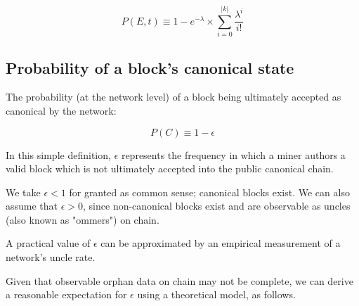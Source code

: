 \documentclass[11pt]{article}
\theoremstyle{plain}
\newcommand{\comment}[1]{}
\begin{document}
{\begin{equation}
P(E,t) \equiv 1 - e^{-\lambda} \times \sum_{i=0}^{|k|}{\frac{\lambda^{i}}{i!}} 
\end{equation}



\subsection{\normalsize{Probability of a block's canonical state}}

The probability (at the network level) of a block being ultimately accepted as
canonical by the network:

\begin{equation}
P(C) \equiv 1 - \epsilon
\end{equation}

In this simple definition, $\epsilon$ represents the frequency in which a miner
authors a valid block which is not ultimately accepted into the public canonical chain.

We take $\epsilon < 1$ for granted as common sense; canonical blocks exist.
We can also assume that $\epsilon > 0$, since non-canonical blocks exist and
are observable as uncles (also known as "ommers") on chain.

A practical value of $\epsilon$ can be approximated by an empirical measurement
of a network's uncle rate.\nolinebreak
\comment{
\footnote{
  There is a lot to say about this, and the nuances of this idea are important
for understanding what kind of approximation this is, and what its limits are.
  A few brief statements are provided for context below, but should not be
considered comprehensive or definitive:

  The Uncle rate represents a record of the existence of blocks which are not
canonical.
  Iff the revenue for those non-canonical blocks is less than their cost of
production, the existence of any non-canonical blocks implies waste, which
suggests a production inefficiency and an economically undesirable
characteristic.
  From this, understanding that the uncle records provided on chain are
potentially incomplete records of the existence of non-canonical blocks.

  We might explore this further by look at the rewards more closely.

  Is it actually reasonable for a miner to record an uncle, getting the
  other miner paid? Or are uncles only recorded when the author of the
  canonical block is also the author of the uncle?
}}
Given that observable orphan data on chain may not be complete,
we can derive a reasonable expectation for $\epsilon$ using a
theoretical model, as follows.

}
\end{document}
